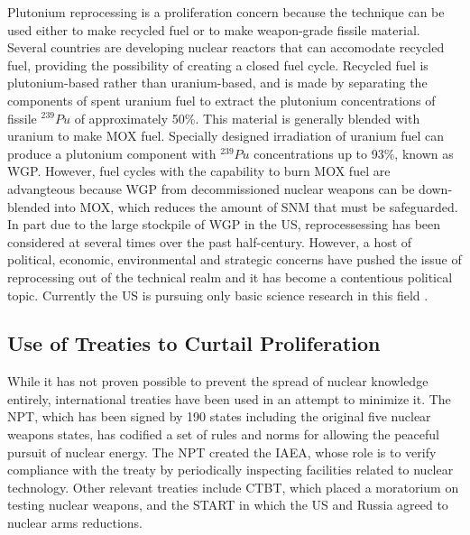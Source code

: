 Plutonium reprocessing is a proliferation concern because the technique can be used either to make recycled fuel or to make weapon-grade fissile material.  Several countries are developing nuclear reactors that can accomodate recycled fuel, providing the possibility of creating a closed fuel cycle\cite{_processing_2015}.  Recycled fuel is plutonium-based rather than uranium-based, and is made by separating the components of spent uranium fuel to extract the plutonium concentrations of fissile $^{239}Pu$ of approximately 50\%.  This material is generally  blended with uranium to make \gls{MOX} fuel.  Specially designed irradiation of uranium fuel can produce a plutonium component with $^{239}Pu$ concentrations up to 93\%, known as \gls{WGP}. However, fuel cycles with the capability to burn \gls{MOX} fuel are advangteous because \gls{WGP} from decommissioned nuclear weapons can be down-blended into \gls{MOX}, which reduces the amount of \gls{SNM} that must be safeguarded.  In part due to the large stockpile of \gls{WGP} in the \gls{US}, reprocessessing has been considered at several times over the past half-century.  However, a host of political, economic, environmental and strategic concerns have pushed the issue of reprocessing out of the technical realm and it has become a contentious political topic\cite{rossin_policy_????}.  Currently the \gls{US} is pursuing only basic science research in this field \cite{editorial_adieu_2009}.
 
\subsection{Use of Treaties to Curtail Proliferation}

While it has not proven possible to prevent the spread of nuclear knowledge entirely, international treaties have been used in an attempt to minimize it.  The \gls{NPT}, which has been signed by 190 states including the original five nuclear weapons states, has codified a set of rules and norms for allowing the peaceful pursuit of nuclear energy\cite{_treaty_????}.  The \gls{NPT} created the \gls{IAEA}, whose role is to verify compliance with the treaty by periodically inspecting facilities related to nuclear technology.  Other relevant treaties include \gls{CTBT}, which placed a moratorium on testing nuclear weapons, and the \gls{START} in which the \gls{US} and Russia agreed to nuclear arms reductions.

